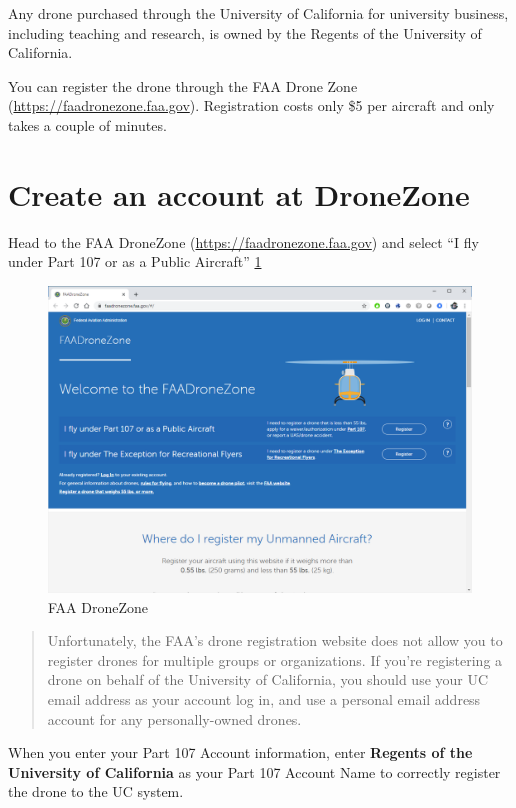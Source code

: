 \documentclass[
]{book}
\begin{document}
Any drone purchased through the University of California for university business, including teaching and research, is owned by the Regents of the University of California.

You can register the drone through the FAA Drone Zone (\url{https://faadronezone.faa.gov}). Registration costs only \$5 per aircraft and only takes a couple of minutes.

\hypertarget{create-an-account-at-dronezone}{%
\section{Create an account at DroneZone}\label{create-an-account-at-dronezone}}

Head to the FAA DroneZone (\url{https://faadronezone.faa.gov}) and select ``I fly under Part 107 or as a Public Aircraft'' \ref{fig:reg-page}

\begin{figure}

{\centering \includegraphics[width=0.8\linewidth]{images/reg_site} 

}

\caption{FAA DroneZone}\label{fig:reg-page}
\end{figure}

\begin{quote}
Unfortunately, the FAA's drone registration website does not allow you to register drones for multiple groups or organizations. If you're registering a drone on behalf of the University of California, you should use your UC email address as your account log in, and use a personal email address account for any personally-owned drones.
\end{quote}

When you enter your Part 107 Account information, enter \textbf{Regents of the University of California} as your Part 107 Account Name to correctly register the drone to the UC system.
\end{document}
